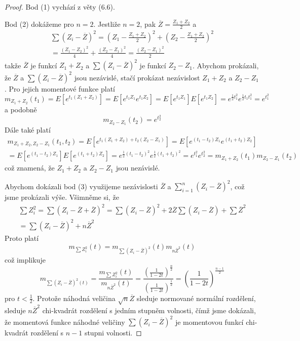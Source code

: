 \begin{proof}
Bod (1) vychází z věty (6.6).

Bod (2) dokážeme pro $n = 2$. Jestliže $n = 2$, pak $\overline{Z} = \frac{Z_1 + Z_2}{2}$ a
\begin{gather*}
\sum (Z_i - \overline{Z})^2 = \left(Z_1 - \frac{Z_1 + Z_2}{2} \right)^2 + \left(Z_2 - \frac{Z_1 + Z_2}{2} \right)^2\\
= \frac{(Z_1 - Z_2)^2}{4} + \frac{(Z_2 - Z_1)^2}{4} = \frac{(Z_2 - Z_1)^2}{2}
\end{gather*}
takže $\overline{Z}$ je funkcí $Z_1 + Z_2$ a $\sum (Z_i - \overline{Z})^2$ je funkcí $Z_2 - Z_1$. Abychom prokázali, že $\overline{Z}$ a $\sum (Z_i - \overline{Z})^2$ jsou nezávislé, stačí prokázat nezávislost $Z_1 + Z_2$ a $Z_2 - Z_1$. Pro jejich momentové funkce platí
\begin{equation*}
m_{Z_1 + Z_2}(t_1) = E\left[e^{t_1(Z_1 + Z_2)} \right] = E[e^{t_1 Z_1} e^{t_1 Z_2}] = E\left[e^{t_1 Z_1}\right]E\left[e^{t_1 Z_2}\right] = e^{\frac{1}{2} t_1^2}e^{\frac{1}{2} t_1 t_1^2} = e^{t_1^2}
\end{equation*}
a podobně
\begin{equation*}
m_{Z_2 - Z_1}(t_2) = e^{t_2^2}
\end{equation*}
Dále také platí
\begin{gather*}
m_{Z_1 + Z_2, Z_2 - Z_1}(t_1, t_2) = E\left[e^{t_1 (Z_1 + Z_2) + t_2 (Z_2 - Z_1)} \right] = E\left[e^{(t_1 - t_2)Z_1}e^{(t_1 + t_2)Z_2} \right]\\
= E\left[e^{(t_1 - t_2)Z_1}\right]E\left[e^{(t_1 + t_2)Z_2}\right] = e^{\frac{1}{2}(t_1 - t_2)^2}e^{\frac{1}{2}(t_1 + t_2)^2} = e^{t_1^2}e^{t_2^2} = m_{Z_1 + Z_2}(t_1)m_{Z_2 - Z_1}(t_2)
\end{gather*}
což znamená, že $Z_1 + Z_2$ a $Z_2 - Z_1$ jsou nezávislé.

Abychom dokázali bod (3) využijeme nezávislosti $\overline{Z}$ a $\sum_{i = 1}^n(Z_i - \overline{Z})^2$, což jsme prokázali výše. Všimněme si, že
\begin{gather*}
\sum Z_i^2 = \sum (Z_i - \overline{Z} + \overline{Z})^2 = \sum(Z_i - \overline{Z})^2 + 2 \overline{Z} \sum (Z_i - \overline{Z}) + \sum \overline{Z}^2\\
= \sum (Z_i - \overline{Z})^2 + n \overline{Z}^2
\end{gather*}
Proto platí
\begin{equation*}
m_{\sum Z_i^2}(t) = m_{\sum(Z_i - \overline{Z})^2}(t)m_{n \overline{Z}^2}(t)
\end{equation*}
což implikuje
\begin{equation*}
m_{\sum (Z_i - \overline{Z})^2(t)} = \frac{m_{\sum Z_i^2}(t)}{m_{n \overline{Z}^2}(t)} = \frac{\left(\frac{1}{1 - 2t}\right)^{\frac{n}{2}}}{\left(\frac{1}{1 - 2t}\right)^{\frac{1}{2}}} = \left( \frac{1}{1 - 2t} \right)^{\frac{n - 1}{2}}
\end{equation*}
pro $t < \frac{1}{2}$. Protože náhodná veličina $\sqrt{n}\overline{Z}$ sleduje normované normální rozdělení, sleduje $n \overline{Z}^2$ chi-kvadrát rozdělení s jedním stupněm volnosti, čímž jsme dokázali, že momentová funkce náhodné veličiny $\sum (Z_i - \overline{Z})^2$ je momentovou funkcí chi-kvadrát rozdělení s $n - 1$ stupni volnosti.
\end{proof}

